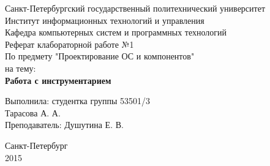 \thispagestyle{empty}
\begin{center}
\large Санкт-Петербургский государственный политехнический университет\\
Институт информационных технологий и управления\\
Кафедра компьютерных систем и программных технологий\\
\vspace{65mm}
\Large Реферат клабораторной работе №1\\ По предмету "Проектирование ОС и компонентов" \\на тему:\\
\LARGE\textbf{Работа с инструментарием}
\end{center}

\vspace{40mm}
\begin{flushright}
\large Выполнила: студентка группы 53501/3\\ Тарасова А. А.\\ Преподаватель: Душутина Е. В.
\end{flushright}
\vspace{30mm}

\begin{center}
Санкт-Петербург\\ 2015
\end{center}